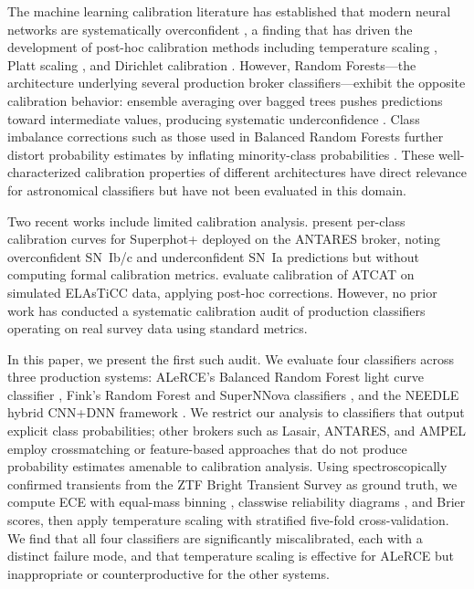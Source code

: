 \documentclass[twocolumn]{aastex631}
\begin{document}
The machine learning calibration literature has established that modern neural networks are systematically overconfident \citep{guo2017}, a finding that has driven the development of post-hoc calibration methods including temperature scaling \citep{guo2017}, Platt scaling \citep{platt1999}, and Dirichlet calibration \citep{kull2019}. However, Random Forests---the architecture underlying several production broker classifiers---exhibit the opposite calibration behavior: ensemble averaging over bagged trees pushes predictions toward intermediate values, producing systematic underconfidence \citep{niculescumizil2005, bostrom2008}. Class imbalance corrections such as those used in Balanced Random Forests further distort probability estimates by inflating minority-class probabilities \citep{vandengoorbergh2022}. These well-characterized calibration properties of different architectures have direct relevance for astronomical classifiers but have not been evaluated in this domain.

Two recent works include limited calibration analysis. \citet{desoto2024} present per-class calibration curves for Superphot+ deployed on the ANTARES broker, noting overconfident SN~Ib/c and underconfident SN~Ia predictions but without computing formal calibration metrics. \citet{tung2025} evaluate calibration of ATCAT on simulated ELAsTiCC data, applying post-hoc corrections. However, no prior work has conducted a systematic calibration audit of production classifiers operating on real survey data using standard metrics.

In this paper, we present the first such audit. We evaluate four classifiers across three production systems: ALeRCE's Balanced Random Forest light curve classifier \citep[lc\_classifier v1.1.13;][]{sanchezsaez2021}, Fink's Random Forest and SuperNNova classifiers \citep{leoni2022, moller2020}, and the NEEDLE hybrid CNN+DNN framework \citep{sheng2024}. We restrict our analysis to classifiers that output explicit class probabilities; other brokers such as Lasair, ANTARES, and AMPEL employ crossmatching or feature-based approaches that do not produce probability estimates amenable to calibration analysis. Using spectroscopically confirmed transients from the ZTF Bright Transient Survey \citep[BTS;][]{fremling2020, perley2020} as ground truth, we compute ECE with equal-mass binning \citep{roelofs2022}, classwise reliability diagrams \citep{nixon2019}, and Brier scores, then apply temperature scaling with stratified five-fold cross-validation. We find that all four classifiers are significantly miscalibrated, each with a distinct failure mode, and that temperature scaling is effective for ALeRCE but inappropriate or counterproductive for the other systems.
\end{document}
